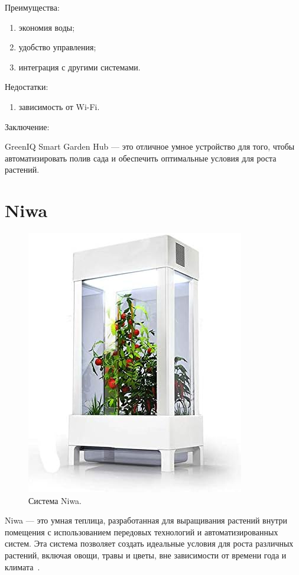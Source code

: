 Преимущества:

\begin{enumerate}
    \item экономия воды;
    \item удобство управления;
    \item интеграция с другими системами.
\end{enumerate}

Недостатки:

\begin{enumerate}
    \item зависимость от Wi-Fi.
\end{enumerate}

Заключение:

GreenIQ Smart Garden Hub --- это отличное умное устройство для того, чтобы автоматизировать полив сада и обеспечить оптимальные условия для роста растений. 

\section{Niwa}

\begin{figure}
    \centering
    \includegraphics{images/Niwa.png}
    \caption{Система Niwa.}
    \label{fig:Niwa}
\end{figure}

Niwa --- это умная теплица, разработанная для выращивания растений внутри помещения с использованием передовых технологий и автоматизированных систем. Эта система позволяет создать идеальные условия для роста различных растений, включая овощи, травы и цветы, вне зависимости от времени года и климата~\cite{Niwa}. 

